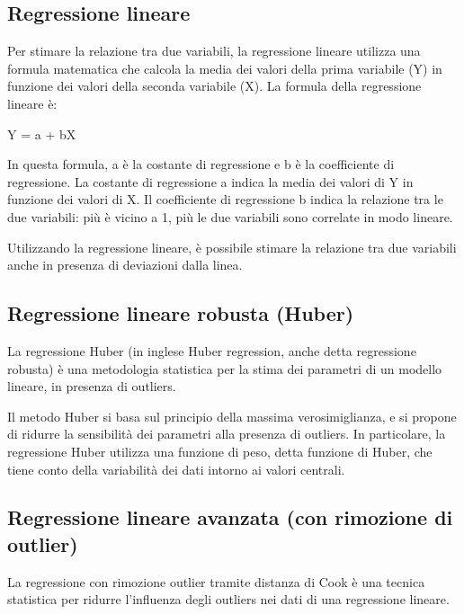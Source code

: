 %
%
%
%
%

\subsection{Regressione lineare}\label{ssec:regressione-lineare}
Per stimare la relazione tra due variabili, la regressione lineare utilizza una formula matematica che calcola la media dei valori della prima variabile (Y) in funzione dei valori della seconda variabile (X). La formula della regressione lineare è:

Y = a + bX

In questa formula, a è la costante di regressione e b è la coefficiente di regressione. La costante di regressione a indica la media dei valori di Y in funzione dei valori di X. Il coefficiente di regressione b indica la relazione tra le due variabili: più è vicino a 1, più le due variabili sono correlate in modo lineare.

Utilizzando la regressione lineare, è possibile stimare la relazione tra due variabili anche in presenza di deviazioni dalla linea.

\subsection{Regressione lineare robusta (Huber)}\label{ssec:regressione-huber}
La regressione Huber (in inglese Huber regression, anche detta regressione robusta) è una metodologia statistica per la stima dei parametri di un modello lineare, in presenza di outliers.

Il metodo Huber si basa sul principio della massima verosimiglianza, e si propone di ridurre la sensibilità dei parametri alla presenza di outliers. In particolare, la regressione Huber utilizza una funzione di peso, detta funzione di Huber, che tiene conto della variabilità dei dati intorno ai valori centrali.

\subsection{Regressione lineare avanzata (con rimozione di outlier)}\label{ssec:regressione-cook}
La regressione con rimozione outlier tramite distanza di Cook è una tecnica statistica per ridurre l'influenza degli outliers nei dati di una regressione lineare.

